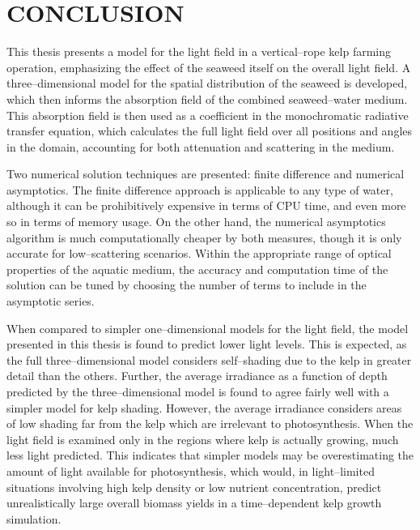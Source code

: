 \chapter{CONCLUSION}
\label{chap:conclusion}

This thesis presents a model for the light field in a vertical--rope kelp farming operation, emphasizing the effect of the seaweed itself on the overall light field.
A three--dimensional model for the spatial distribution of the seaweed is developed, which then informs the absorption field of the combined seaweed--water medium.
This absorption field is then used as a coefficient in the monochromatic radiative transfer equation, which calculates the full light field over all positions and angles in the domain, accounting for both attenuation and scattering in the medium.

Two numerical solution techniques are presented: finite difference and numerical asymptotics.
The finite difference approach is applicable to any type of water, although it can be prohibitively expensive in terms of CPU time, and even more so in terms of memory usage.
On the other hand, the numerical asymptotics algorithm is much computationally cheaper by both measures, though it is only accurate for low--scattering scenarios.
Within the appropriate range of optical properties of the aquatic medium, the accuracy and computation time of the solution can be tuned by choosing the number of terms to include in the asymptotic series.

When compared to simpler one--dimensional models for the light field, the model presented in this thesis is found to predict lower light levels.
This is expected, as the full three--dimensional model considers self--shading due to the kelp in greater detail than the others.
Further, the average irradiance as a function of depth predicted by the three--dimensional model is found to agree fairly well with a simpler model for kelp shading.
However, the average irradiance considers areas of low shading far from the kelp which are irrelevant to photosynthesis.
When the light field is examined only in the regions where kelp is actually growing, much less light predicted.
This indicates that simpler models may be overestimating the amount of light available for photosynthesis, which would, in light--limited situations involving high kelp density or low nutrient concentration, predict unrealistically large overall biomass yields in a time--dependent kelp growth simulation.

